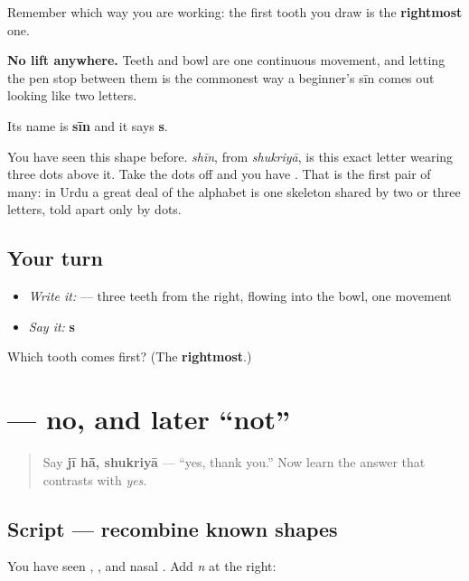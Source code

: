 Remember which way you are working: the first tooth you draw is the \textbf{rightmost} one.

\textbf{No lift anywhere.} Teeth and bowl are one continuous movement, and letting the pen stop between them is the commonest way a beginner's sīn comes out looking like two letters.

Its name is \textbf{sīn} and it says \textbf{s}.

You have seen this shape before. \textbf{} \emph{shīn}, from \emph{shukriyā}, is this exact letter wearing three dots above it. Take the dots off and you have \textbf{}. That is the first pair of many: in Urdu a great deal of the alphabet is one skeleton shared by two or three letters, told apart only by dots.

\subsection*{Your turn}
\begin{itemize}
\raggedright
  \item \emph{Write it:}  — three teeth from the right, flowing into the bowl, one movement
  \item \emph{Say it:} \textbf{s}
\end{itemize}

\begin{tcolorbox}[breakable,colback=teal!4,colframe=teal!35!black,title={Before you move on}]
Which tooth comes first? (The \textbf{rightmost}.)
\end{tcolorbox}
\section[\texorpdfstring{\ur{نہیں} (nahī̃)}{نہیں (nahī̃)}]{ — no, and later “not”}

\label{lesson:UR-C01-nahin}



\begin{quote}
Say \textbf{jī hā̃, shukriyā} — “yes, thank you.” Now learn the answer that contrasts with \emph{yes}.
\end{quote}

\subsection*{Script — recombine known shapes}
You have seen \textbf{}, \textbf{}, and nasal \textbf{}. Add \textbf{} \emph{n} at the right:


